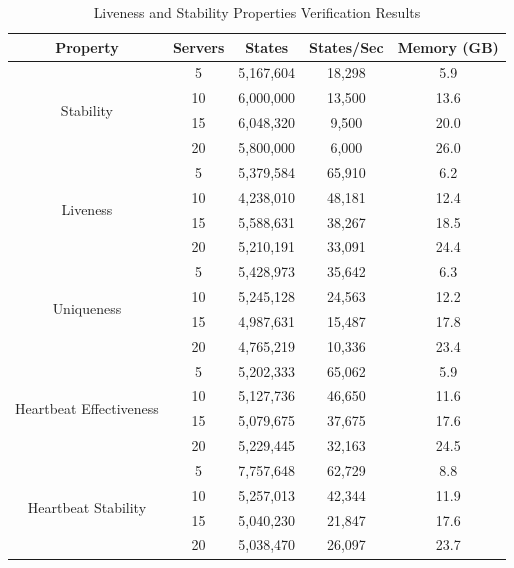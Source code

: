 \documentclass[a4paper]{llncs}
\renewcommand{\arraystretch}{0.85} %
\newcommand{\compacttable}[1]{%
  \begingroup
  \scriptsize
  \setlength{\tabcolsep}{2.5pt}%
  \renewcommand{\arraystretch}{0.8}%
  #1%
  \endgroup
}
\begin{document}
\begin{table}[!htbp]
\centering
\caption{Liveness and Stability Properties Verification Results}
\label{tab:liveness-stability}
\compacttable{
\begin{tabular}{|c|c|c|c|c|}
\hline
\textbf{Property} & \textbf{Servers} & \textbf{States} & \textbf{States/Sec} & \textbf{Memory (GB)} \\
\hline
\multirow{4}{*}{Stability} & 5 & 5,167,604 & 18,298 & 5.9 \\
\cline{2-5}
 & 10 & 6,000,000 & 13,500 & 13.6 \\
\cline{2-5}
 & 15 & 6,048,320 & 9,500 & 20.0 \\
\cline{2-5}
 & 20 & 5,800,000 & 6,000 & 26.0 \\
\hline
\multirow{4}{*}{Liveness} & 5 & 5,379,584 & 65,910 & 6.2 \\
\cline{2-5}
 & 10 & 4,238,010 & 48,181 & 12.4 \\
\cline{2-5}
 & 15 & 5,588,631 & 38,267 & 18.5 \\
\cline{2-5}
 & 20 & 5,210,191 & 33,091 & 24.4 \\
\hline
\multirow{4}{*}{Uniqueness} & 5 & 5,428,973 & 35,642 & 6.3 \\
\cline{2-5}
 & 10 & 5,245,128 & 24,563 & 12.2 \\
\cline{2-5}
 & 15 & 4,987,631 & 15,487 & 17.8 \\
\cline{2-5}
 & 20 & 4,765,219 & 10,336 & 23.4 \\
\hline
\multirow{4}{*}{Heartbeat Effectiveness} & 5 & 5,202,333 & 65,062 & 5.9 \\
\cline{2-5}
 & 10 & 5,127,736 & 46,650 & 11.6 \\
\cline{2-5}
 & 15 & 5,079,675 & 37,675 & 17.6 \\
\cline{2-5}
 & 20 & 5,229,445 & 32,163 & 24.5 \\
\hline
\multirow{4}{*}{Heartbeat Stability} & 5 & 7,757,648 & 62,729 & 8.8 \\
\cline{2-5}
 & 10 & 5,257,013 & 42,344 & 11.9 \\
\cline{2-5}
 & 15 & 5,040,230 & 21,847 & 17.6 \\
\cline{2-5}
 & 20 & 5,038,470 & 26,097 & 23.7 \\
\hline
\end{tabular}
}
\end{table}
\end{document}
